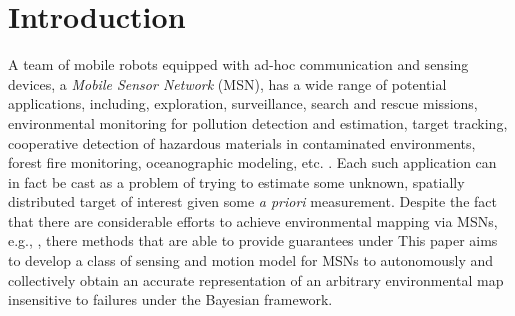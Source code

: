 \documentclass[letterpaper, 10 pt, conference]{ieeeconf}
\newcommand{\rood}[1]{{\color{red}{[#1]}}}
\begin{document}
\section{Introduction}
\label{sec:sec1}
A team of mobile robots equipped with ad-hoc communication and sensing devices, a \emph{Mobile Sensor Network} (MSN), has a wide range of potential applications, including, exploration, surveillance, search and rescue missions, environmental monitoring for pollution detection and estimation, target tracking, cooperative detection of hazardous materials in contaminated environments, forest fire monitoring, oceanographic modeling, etc. \cite{dhillon2003sensor,cortes_coverage_2004,yu2005real}. 
Each such application can in fact be cast as a problem of trying to estimate some unknown, spatially distributed target of interest given some \textit{a priori} measurement. 
Despite the fact that there are considerable efforts to achieve environmental mapping via MSNs, e.g., \cite{connor2016airborne,schwager2017multi,cortez2011information}, 
there \rood{are no known } methods that are able to provide \rood{formal} guarantees under \rood{sensor failure, e.g., erroneous sensor readings.}
This paper aims to develop a class of sensing and motion model for MSNs to autonomously and collectively obtain an accurate representation of an arbitrary environmental map insensitive to failures under the Bayesian framework.
\end{document}
